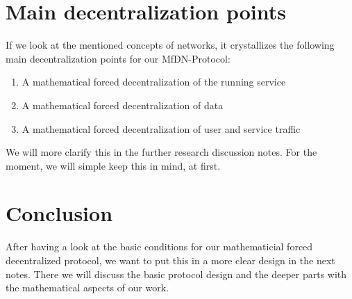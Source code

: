\documentclass[12pt]{../document-templates/papers/one-column-mydashie/mydashie}
\newtheorem*{theorem A}{Theorem A}
\newtheorem*{theorem B}{N\"olker's Theorem}
\theoremstyle{remark}
\theoremstyle{remark}
\begin{document}
\section{Main decentralization points}
\label{s:maindecentralizationpoints}
If we look at the mentioned concepts of networks, it crystallizes the following main decentralization points for our MfDN-Protocol:
\begin{enumerate}
	\item A mathematical forced decentralization of the running service
	\item A mathematical forced decentralization of data
	\item A mathematical forced decentralization of user and service traffic
\end{enumerate} 

We will more clarify this in the further research discussion notes. For the moment, we will simple keep this in mind, at first.

\section{Conclusion}
\label{s:conclusion}
After having a look at the basic conditions for our mathematicial forced decentralized protocol, we want to put this in a more clear design in the next notes. There we will discuss the basic protocol design and the deeper parts with the mathematical aspects of our work.
\end{document}
